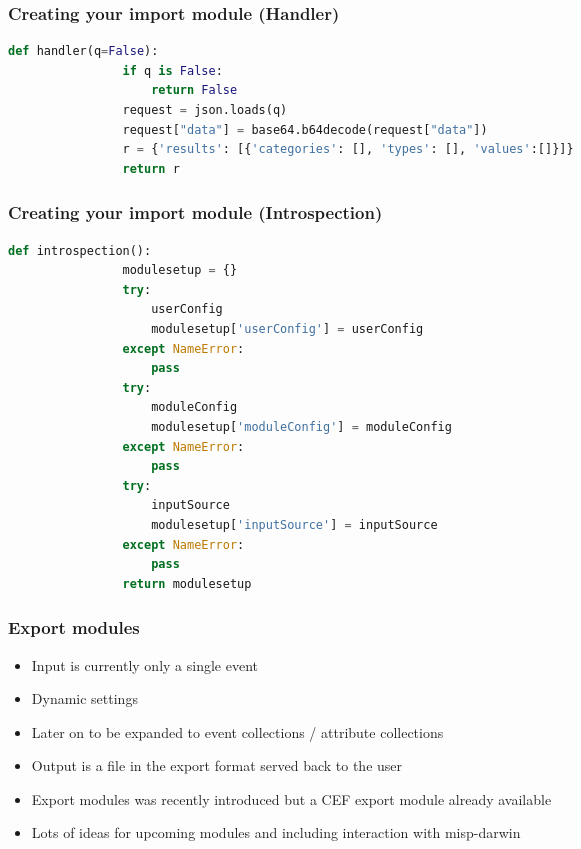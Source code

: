 \begin{frame}[fragile]
    \frametitle{Creating your import module (Handler)}
    \begin{adjustbox}{width=\textwidth,height=5cm,keepaspectratio}
        \begin{lstlisting}[language=python]
            def handler(q=False):
                if q is False:
                    return False
                request = json.loads(q)
                request["data"] = base64.b64decode(request["data"])
                r = {'results': [{'categories': [], 'types': [], 'values':[]}]}
                return r
        \end{lstlisting}
    \end{adjustbox}
\end{frame}

\begin{frame}[fragile]
    \frametitle{Creating your import module (Introspection)}
    \begin{adjustbox}{width=\textwidth,height=5cm,keepaspectratio}
        \begin{lstlisting}[language=python]
            def introspection():
                modulesetup = {}
                try:
                    userConfig
                    modulesetup['userConfig'] = userConfig
                except NameError:
                    pass
                try:
                    moduleConfig
                    modulesetup['moduleConfig'] = moduleConfig
                except NameError:
                    pass
                try:
                    inputSource
                    modulesetup['inputSource'] = inputSource
                except NameError:
                    pass
                return modulesetup
        \end{lstlisting}
    \end{adjustbox}
\end{frame}

\begin{frame}[fragile]
    \frametitle{Export modules}
    \begin{itemize}
       \item Input is currently only a single event
       \item Dynamic settings
       \item Later on to be expanded to event collections / attribute collections
       \item Output is a file in the export format served back to the user
       \item Export modules was recently introduced but a CEF export module already available
       \item Lots of ideas for upcoming modules and including interaction with misp-darwin
    \end{itemize}
\end{frame}

